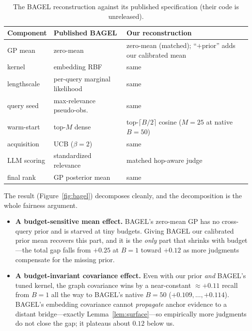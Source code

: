 \documentclass[11pt]{article}
\theoremstyle{plain}
\theoremstyle{definition}
\theoremstyle{remark}
\begin{document}
\begin{table}[h]\centering\small
\caption{The BAGEL reconstruction against its published specification (their code is unreleased).}\label{tab:bagel-spec}
\begin{tabular}{lll}
\toprule
Component & Published BAGEL & Our reconstruction \\ \midrule
GP mean & zero-mean & zero-mean (matched); ``$+$prior'' adds our calibrated mean \\
kernel & embedding RBF & same \\
lengthscale & per-query marginal likelihood & same \\
query seed & max-relevance pseudo-obs. & same \\
warm-start & top-$M$ dense & top-$\lceil B/2\rceil$ cosine ($M{=}25$ at native $B{=}50$) \\
acquisition & UCB ($\beta{=}2$) & same \\
LLM scoring & standardized relevance & matched hop-aware judge \\
final rank & GP posterior mean & same \\
\bottomrule
\end{tabular}
\end{table}

The result (Figure~\ref{fig:bagel}) decomposes cleanly, and the decomposition is the whole fairness argument.
\begin{itemize}[topsep=2pt,itemsep=2pt,leftmargin=*]
\item \textbf{A budget-sensitive mean effect.} BAGEL's zero-mean GP has no cross-query prior and is starved at tiny
budgets. Giving BAGEL our calibrated prior mean recovers this part, and it is the \emph{only} part that shrinks with
budget---the total gap falls from $+0.25$ at $B=1$ toward $+0.12$ as more judgments compensate for the missing prior.
\item \textbf{A budget-invariant covariance effect.} Even with our prior \emph{and} BAGEL's tuned kernel, the graph
covariance wins by a near-constant $\approx+0.11$ recall from $B=1$ all the way to BAGEL's native $B=50$
($+0.109,\dots,+0.114$). BAGEL's embedding covariance cannot \emph{propagate} anchor evidence to a distant
bridge---exactly Lemma~\ref{lem:surface}---so empirically more judgments do not close the gap; it plateaus about
$0.12$ below us.
\end{itemize}
\end{document}
